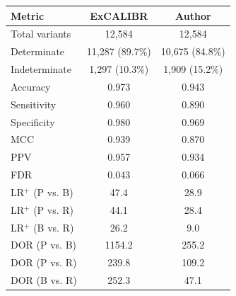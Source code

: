 \begin{tabular}{lcc}
\toprule
Metric & ExCALIBR & Author \\
\midrule
Total variants & 12,584 & 12,584 \\
Determinate & 11,287 (89.7\%) & 10,675 (84.8\%) \\
Indeterminate & 1,297 (10.3\%) & 1,909 (15.2\%) \\
\midrule
Accuracy & 0.973 & 0.943 \\
Sensitivity & 0.960 & 0.890 \\
Specificity & 0.980 & 0.969 \\
MCC & 0.939 & 0.870 \\
PPV & 0.957 & 0.934 \\
FDR & 0.043 & 0.066 \\
\midrule
LR$^+$ (P vs. B) & 47.4 & 28.9 \\
LR$^+$ (P vs. R) & 44.1 & 28.4 \\
LR$^+$ (B vs. R) & 26.2 & 9.0 \\
DOR (P vs. B) & 1154.2 & 255.2 \\
DOR (P vs. R) & 239.8 & 109.2 \\
DOR (B vs. R) & 252.3 & 47.1 \\
\bottomrule
\end{tabular}
